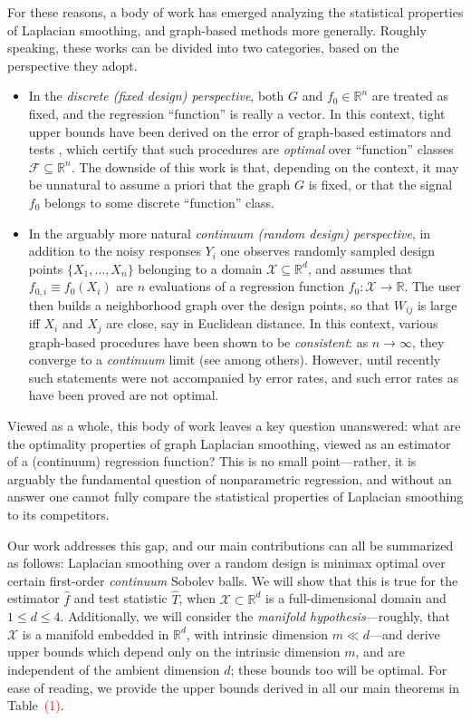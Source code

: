 \documentclass[twoside]{article}
\newcommand{\Reals}{\mathbb{R}}
\newcommand{\1}{\mathbf{1}}
\newcommand{\Rd}{\Reals^d}
\newcommand{\Xset}{\mathcal{X}}
\newcommand{\mc}[1]{\mathcal{#1}}
\newcommand{\wh}[1]{\widehat{#1}}
\theoremstyle{definition}
\theoremstyle{remark}
\begin{document}
For these reasons, a body of work has emerged analyzing the statistical properties of Laplacian smoothing, and graph-based methods more generally. Roughly speaking, these works can be divided into two categories, based on the perspective they adopt. 
\begin{itemize}
	\item In the \emph{discrete (fixed design) perspective}, both $G$ and $f_0 \in \Reals^n$ are treated as fixed, and the regression ``function'' is really a vector. In this context, tight upper bounds have been derived on the error of graph-based estimators \citep{wang2016, sadhanala16,sadhanala17,kirichenko2017,kirichenko2018} and tests \citep{sharpnack2013,sharpnack2013b,sharpnack2015}, which certify that such procedures are \emph{optimal} over ``function'' classes $\mc{F} \subseteq \Reals^n$. The downside of this work is that, depending on the context, it may be unnatural to assume a priori that the graph $G$ is fixed, or that the signal $f_0$ belongs to some discrete ``function'' class.
	\item In the arguably more natural \emph{continuum (random design) perspective}, in addition to the noisy responses $Y_i$ one observes randomly sampled design points $\{X_1,\ldots,X_n\}$ belonging to a domain $\Xset \subseteq \Rd$, and assumes that $f_{0,i} \equiv f_0(X_i)$ are $n$ evaluations of a regression function $f_0: \Xset \to \Reals$. The user then builds a neighborhood graph over the design points, so that $W_{ij}$ is large iff $X_i$ and $X_j$ are close, say in Euclidean distance. In this context, various graph-based procedures have been shown to be \emph{consistent}: as $n \to \infty$, they converge to a \emph{continuum} limit (see \citep{belkin07,trillos2018,vonluxburg2008} among others). However, until recently such statements were not accompanied by error rates, and such error rates as have been proved \citep{lee2016,trillos2020} are not optimal.
\end{itemize}
Viewed as a whole, this body of work leaves a key question unanswered: what are the optimality properties of graph Laplacian smoothing, viewed as an estimator of a (continuum) regression function? This is no small point---rather, it is arguably the fundamental question of nonparametric regression, and without an answer one cannot fully compare the statistical properties of Laplacian smoothing to its competitors.

Our work addresses this gap, and our main contributions can all be summarized as follows: Laplacian smoothing over a random design is minimax optimal over certain first-order \emph{continuum} Sobolev balls. We will show that this is true for the estimator $\wh{f}$ and test statistic $\wh{T}$, when $\Xset \subset \Rd$ is a full-dimensional domain and $1 \leq d \leq 4$. Additionally, we will consider the \emph{manifold hypothesis}---roughly, that $\Xset$ is a manifold embedded in $\Rd$, with intrinsic dimension $m \ll d$---and derive upper bounds which depend only on the intrinsic dimension $m$, and are independent of the ambient dimension $d$; these bounds too will be optimal. For ease of reading, we provide the upper bounds derived in all our main theorems in Table~\textcolor{red}{(1)}.
\end{document}
